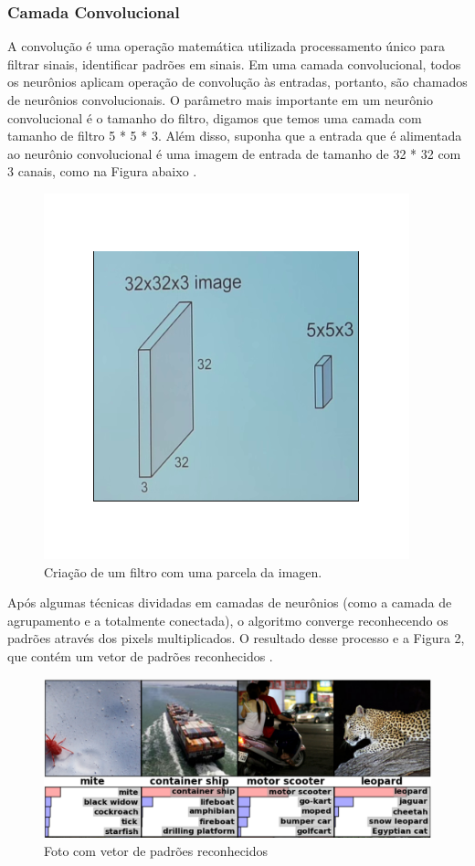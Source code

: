 \documentclass[conference]{IEEEtran}
\begin{document}
	\subsubsection{Camada Convolucional}
	A convolução é uma operação matemática utilizada processamento único para filtrar sinais, identificar padrões em sinais. Em uma camada convolucional, todos os neurônios aplicam operação de convolução às entradas, portanto, são chamados de neurônios convolucionais. O parâmetro mais importante em um neurônio convolucional é o tamanho do filtro, digamos que temos uma camada com tamanho de filtro 5 * 5 * 3. Além disso, suponha que a entrada que é alimentada ao neurônio convolucional é uma imagem de entrada de tamanho de 32 * 32 com 3 canais, como na Figura abaixo \cite{IEEEhowto:4}. 
	
	\begin{figure}[H]
		\centering
		\includegraphics[scale=0.2]{imagen/1.png}
		
		\caption{Criação de um filtro com uma parcela da imagen.}
		\label{figRotulo}
	\end{figure}
	Após algumas técnicas dividadas em camadas de neurônios (como a camada de agrupamento e a totalmente conectada), o algoritmo converge reconhecendo os padrões através dos pixels multiplicados.
	O resultado desse processo e a Figura 2, que contém um vetor de padrões reconhecidos \cite{IEEEhowto:3}.

	 \begin{figure}[H]
		\centering
		\includegraphics[scale=0.15]{imagen/AlexClassification.png}
		
		\caption{Foto com vetor de padrões reconhecidos}
		\label{figRotulo}
	\end{figure}
\end{document}
